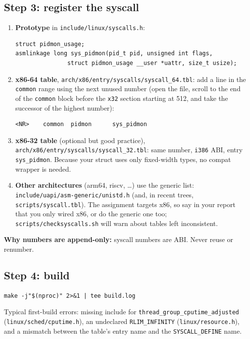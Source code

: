 \documentclass[11pt,a4paper]{article}
\newcommand{\kfile}[1]{\texttt{\small #1}}
\begin{document}
\subsection{Step 3: register the syscall}
\begin{enumerate}
  \item \textbf{Prototype} in \kfile{include/linux/syscalls.h}:
\begin{lstlisting}
struct pidmon_usage;
asmlinkage long sys_pidmon(pid_t pid, unsigned int flags,
			   struct pidmon_usage __user *uattr, size_t usize);
\end{lstlisting}
  \item \textbf{x86-64 table}, \kfile{arch/x86/entry/syscalls/syscall\_64.tbl}: add a line in the \texttt{common} range using the next unused number (open the file, scroll to the end of the \texttt{common} block before the \texttt{x32} section starting at 512, and take the successor of the highest number):
\begin{lstlisting}[style=sh]
<NR>	common	pidmon		sys_pidmon
\end{lstlisting}
  \item \textbf{x86-32 table} (optional but good practice), \kfile{arch/x86/entry/syscalls/syscall\_32.tbl}: same number, \texttt{i386} ABI, entry \texttt{sys\_pidmon}. Because your struct uses only fixed-width types, no compat wrapper is needed.
  \item \textbf{Other architectures} (arm64, riscv, \dots) use the generic list: \kfile{include/uapi/asm-generic/unistd.h} (and, in recent trees, \kfile{scripts/syscall.tbl}). The assignment targets x86, so say in your report that you only wired x86, or do the generic one too; \texttt{scripts/checksyscalls.sh} will warn about tables left inconsistent.
\end{enumerate}
\textbf{Why numbers are append-only:} syscall numbers are ABI. Never reuse or renumber.

\subsection{Step 4: build}
\begin{lstlisting}[style=sh]
make -j"$(nproc)" 2>&1 | tee build.log
\end{lstlisting}
Typical first-build errors: missing include for \texttt{thread\_group\_cputime\_adjusted} (\texttt{linux/sched/cputime.h}), an undeclared \texttt{RLIM\_INFINITY} (\texttt{linux/resource.h}), and a mismatch between the table's entry name and the \texttt{SYSCALL\_DEFINE} name.
\end{document}
